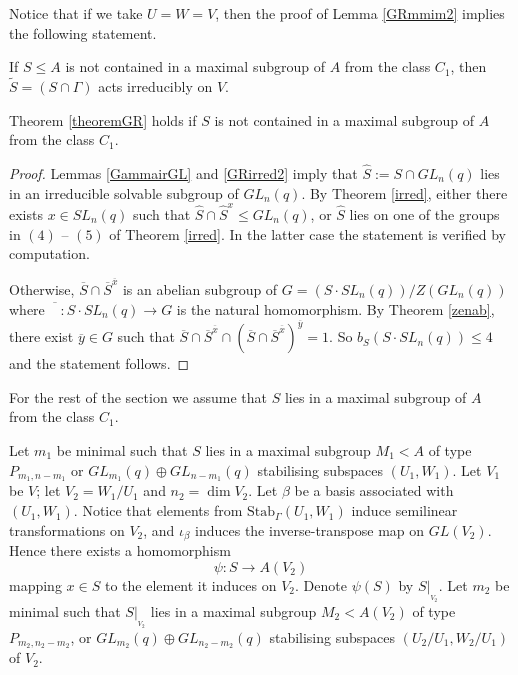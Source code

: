 Notice that if we take $U=W=V$, then the proof of Lemma \ref{GRmmim2} implies the following statement.
\begin{Lem}
\label{GRirred2}
If $S \le A$ is not contained  in a maximal subgroup of $A$ from the class $\mathit{C_1}$, then $\tilde{S}=(S \cap \Gamma)$ acts irreducibly on $V$.
\end{Lem}

\begin{Th}
Theorem {\rm \ref{theoremGR}} holds if $S$ is not contained  in a maximal subgroup of $A$ from the class $\mathit{C_1}$.
\end{Th}
\begin{proof}
 Lemmas \ref{GammairGL}  and \ref{GRirred2}  imply that $\hat{S}:=S \cap GL_n(q)$ lies in an irreducible solvable subgroup of $GL_n(q)$. By Theorem \ref{irred}, either there exists $x \in SL_n(q)$ such that $\hat{S} \cap \hat{S}^x \le GL_n(q)$, or $\hat{S}$ lies on one of the groups in $(4)$ -- $(5)$ of Theorem \ref{irred}. In the latter case the statement is verified by computation. 

Otherwise, $\overline{S} \cap \overline{S}^{\overline{x}}$ is an abelian subgroup of $G=(S \cdot SL_n(q))/Z(GL_n(q))$ where $\overline{\phantom{G}}:S \cdot SL_n(q) \to G$ is the natural homomorphism.  By Theorem \ref{zenab}, there exist $\overline{y} \in G$ such that $\overline{S} \cap \overline{S}^{\overline{x}} \cap (\overline{S} \cap \overline{S}^{\overline{x}})^{\overline{y}}=1.$ So $b_S(S \cdot SL_n(q)) \le 4$ and the statement follows. 
\end{proof}

For the rest of the section we assume that $S$ lies in a maximal subgroup of $A$ from the class $\mathit{C_1}$.

 Let $m_1$ be minimal such that $S$ lies in a maximal subgroup $M_1<A$ of type $P_{m_1, n-m_1}$ or $GL_{m_1}(q) \oplus GL_{n-m_1}(q)$ stabilising subspaces $(U_1,W_1)$. Let $V_1$ be $V$;  let $V_2=W_1/U_1$ and $n_2=\dim V_2$. Let $\beta$ be a basis associated with $(U_1,W_1).$ Notice that elements from $\mathrm{Stab}_{\Gamma}(U_1,W_1)$ induce semilinear transformations on $V_2$, and $\iota_{\beta}$ induces the inverse-transpose map on $GL(V_2).$  Hence there exists a homomorphism 
$$\psi: S \to A(V_2) $$ mapping $x \in S$ to the element it induces on $V_2.$ Denote $\psi(S)$ by $S|_{_{V_2}}.$ Let $m_2$ be minimal such that $S|_{_{V_2}}$ lies in a maximal subgroup $M_2<A(V_2)$ of type $P_{m_2, n_2-m_2}$, or $GL_{m_2}(q) \oplus GL_{n_2-m_2}(q)$ stabilising subspaces $(U_2/U_1,W_2/U_1)$ of $V_2$.

